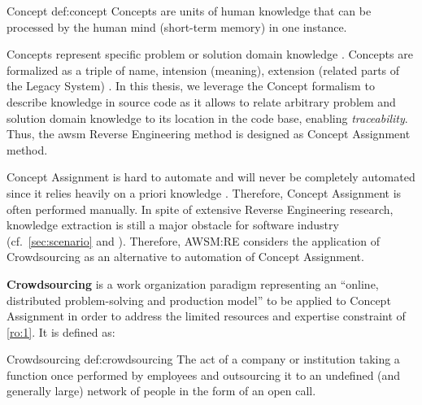 \vspace{-15pt}
\begin{thesisdefinition}{Concept \autocite{Rajlich2002Concepts}}{def:concept}
Concepts are units of human knowledge that can be processed by the human mind (short-term memory) in one instance.
\end{thesisdefinition}

\vspace{-5pt}
\glspl{Concept} represent specific problem or solution domain knowledge \autocite{Marcus2004ProblemLocation}.
\glspl{Concept} are formalized as a triple of name, intension (meaning), extension (related parts of the \gls{Legacy System}) \autocite{Chen2010FeatureLocation}.
In this thesis, we leverage the \gls{Concept} formalism to describe knowledge in  source code as it allows to relate arbitrary problem and solution domain knowledge to its location in the  code base, enabling \emph{traceability}.
Thus, the \gls{awsm} \gls{Reverse Engineering} method is designed as \gls{Concept Assignment} method.

\gls{Concept Assignment} is hard to automate and will never be completely automated since it relies heavily on a priori knowledge \autocite{Biggerstaff1993ConceptAssignmentICSE}.
Therefore, \gls{Concept Assignment} is often performed manually.
In spite of extensive \gls{Reverse Engineering} research, knowledge extraction is still a major obstacle for software industry (cf.~\cref{sec:scenario} and \autocite{Khadka2014ProfessionalsModernization,Batlajery2014IndustrialSurveyModernization}).
Therefore, AWSM:RE considers the application of \gls{Crowdsourcing} as an alternative to automation of \gls{Concept Assignment}.

\textbf{\gls{Crowdsourcing}} is a work organization paradigm representing an ``online, distributed problem-solving and production model'' \autocite{Brabham2008} to be applied to \gls{Concept Assignment} in order to address the limited resources and expertise constraint of \cref{ro:1}.
It is defined as:

\vspace{-15pt}
\begin{thesisdefinition}{Crowdsourcing \autocite{Howe2006}}{def:crowdsourcing}
The act of a company or institution taking a function once performed by employees and outsourcing it to an undefined (and generally large) network of people in the form of an open call.
\end{thesisdefinition}

